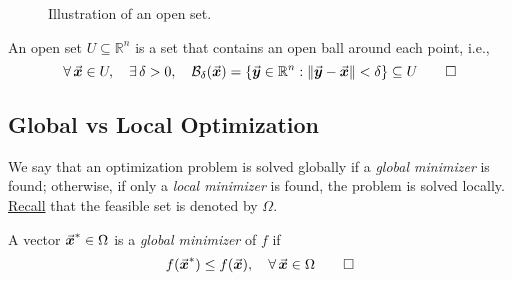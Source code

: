 \begin{figure}[h]
  \centering
  \caption*{Illustration of an open set.}
  \label{fig:open_set}
\end{figure}
\begin{definition}
An open set \(U\subseteq\mathbb{R}^{n}\) is a set that contains an open ball around each point, i.e.,
\[
\forall\, \vec{\boldsymbol{x}}\in U, \quad \exists\, \delta>0, \quad \mathcal{B}_{\delta}(\vec{\boldsymbol{x}})=\{ \vec{\boldsymbol{y}}\in\mathbb{R}^{n} : \|\vec{\boldsymbol{y}}-\vec{\boldsymbol{x}}\|<\delta \} \subseteq U
\qedhere
\]
\end{definition}



\subsection{Global vs Local Optimization}\label{subsec:global_local_optimization}
We say that an optimization problem is solved globally if a \emph{global minimizer} is found; otherwise, if only a \emph{local minimizer} is found, the problem is solved locally. \hyperref[eq:feasible_set]{Recall} that the feasible set is denoted by \(\Omega\).

\begin{definition}\label{def:global_minimizer}
A vector \(\vec{\boldsymbol{x}}^{*}\in\Omega\) is a \emph{global minimizer} of \(f\) if
\[
f(\vec{\boldsymbol{x}}^{*})\leq f(\vec{\boldsymbol{x}}),\quad \forall\, \vec{\boldsymbol{x}}\in\Omega \qedhere
\]
\end{definition}

